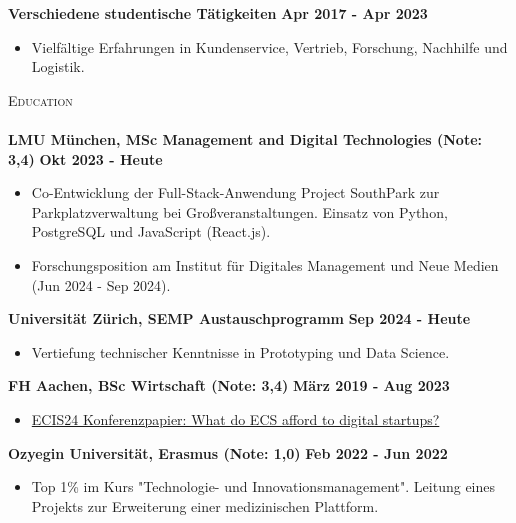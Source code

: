 \documentclass[a4paper]{article}
\newcommand{\lineunder} {
    \vspace*{-8pt} \\
    \hspace*{-18pt} \hrulefill \\
}
\newcommand{\header} [1] {
    {\hspace*{-18pt}\vspace*{6pt} \textsc{#1}}
    \vspace*{-6pt} \lineunder
}
\begin{document}
\vspace{-2mm}
\textbf{Verschiedene studentische T\"atigkeiten} \hfill \textbf{ Apr 2017 - Apr 2023}\\
\vspace{-2mm}
\begin{itemize} \itemsep -2pt
    \item Vielf\"altige Erfahrungen in Kundenservice, Vertrieb, Forschung, Nachhilfe und Logistik.
\end{itemize}
\vspace{-1mm}

\header{Education}
\textbf{LMU M\"unchen, MSc Management and Digital Technologies (Note: 3,4)}\hfill \textbf{ Okt 2023 - Heute}\\
\vspace{-2mm}
\begin{itemize} \itemsep -2pt
	\item Co-Entwicklung der Full-Stack-Anwendung Project SouthPark zur Parkplatzverwaltung bei Großveranstaltungen. Einsatz von Python, PostgreSQL und JavaScript (React.js).
    \item Forschungsposition am Institut f\"ur Digitales Management und Neue Medien (Jun 2024 - Sep 2024).
\end{itemize}
\vspace{-2mm}
\textbf{Universit\"at Z\"urich, SEMP Austauschprogramm}\hfill \textbf{ Sep 2024 - Heute}\\
\vspace{-2mm}
\begin{itemize} \itemsep -2pt
	\item Vertiefung technischer Kenntnisse in Prototyping und Data Science.
\end{itemize}
\vspace{-2mm}
\textbf{FH Aachen, BSc Wirtschaft (Note: 3,4)}\hfill \textbf{ M\"arz 2019 - Aug 2023}\\
\vspace{-2mm}
\begin{itemize} \itemsep -2pt
	\item \href {https://aisel.aisnet.org/ecis2024/track24_socialmedia/track24_socialmedia/6/}  {ECIS24 Konferenzpapier: What do ECS afford to digital startups?}
\end{itemize}
\vspace{-2mm}
\textbf{Ozyegin Universit\"at, Erasmus (Note: 1,0)}\hfill \textbf{ Feb 2022 - Jun 2022}\\
\vspace{-2mm}
\begin{itemize} \itemsep -2pt
    \item Top 1\% im Kurs "Technologie- und Innovationsmanagement". Leitung eines Projekts zur Erweiterung einer medizinischen Plattform.
\end{itemize}
\end{document}
